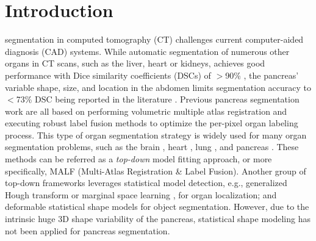 \documentclass[journal]{IEEEtran}
\begin{document}
\IEEEpeerreviewmaketitle
\section{Introduction}
 segmentation in computed tomography (CT) challenges current computer-aided diagnosis (CAD) systems. While automatic segmentation of numerous other organs in CT scans, such as the liver, heart or kidneys, achieves good performance with Dice similarity coefficients (DSCs) of $>$90\% \cite{Wang2014Miccai,Chu2013Miccai,wolz2013automated}, the pancreas' variable shape, size, and location in the abdomen limits segmentation accuracy to $<$73\% DSC being reported in the literature \cite{wolz2013automated,Chu2013Miccai,tong2015discriminative,okada2015abdominal,farag2014bottom,roth2015deeporgan}. Previous pancreas segmentation work \cite{wolz2013automated,Chu2013Miccai,tong2015discriminative,okada2015abdominal} are all based on performing volumetric multiple atlas registration \cite{Modat2010,avants2009advanced,Avants2011reproducible} and executing robust label fusion methods \cite{Wang2013Multi,Bai2013probabilistic,Wang2014Segmentation} to optimize the per-pixel organ labeling process. This type of organ segmentation strategy is widely used for many organ segmentation problems, such as the brain \cite{Wang2013Multi,Wang2014Segmentation}, heart \cite{Bai2013probabilistic}, lung \cite{Murphy2011Evaluation}, and pancreas \cite{wolz2013automated,Chu2013Miccai,tong2015discriminative,okada2015abdominal}. These methods can be referred as a {\em top-down} model fitting approach, or more specifically, MALF (Multi-Atlas Registration \& Label Fusion). Another group of top-down frameworks \cite{Ecabert2008Automatic,Zheng08,Ling08} leverages statistical model detection, e.g., generalized Hough transform \cite{Ecabert2008Automatic} or marginal space learning \cite{Zheng08,Ling08}, for organ localization; and deformable statistical shape models for object segmentation. However, due to the intrinsic huge 3D shape variability of the pancreas, statistical shape modeling has not been applied for pancreas segmentation.
\end{document}
